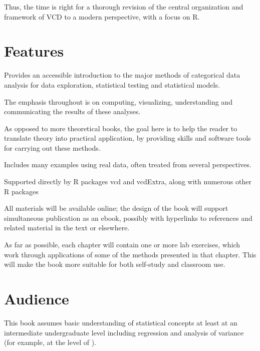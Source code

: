 \documentclass{article}
\newcommand{\VCD}{\textsf{VCD}\xspace}
\newcommand{\R}{\textsf{R}\xspace}
\newcommand{\pkg}[1]{{\normalfont\fontseries{b}\selectfont #1}}
\begin{document}
Thus, the time is right for a thorough revision of the central organization
and framework of \VCD to a modern perspective, with a focus on \R.
%

\section*{Features}

\begin{itemize*}
	\item Provides an accessible introduction to the major methods of categorical data analysis
    for data exploration, statistical testing and statistical models.
	\item The emphasis throughout is on computing, visualizing, understanding and communicating
	the results of these analyses.
    \item As opposed to more theoretical books, the goal here is to
    help the reader to translate theory into practical application, by providing skills and
    software tools for carrying out these methods.
	\item Includes many examples using real data, often treated from several perspectives.
	\item Supported directly by \R packages \pkg{vcd} and \pkg{vcdExtra}, along with numerous other \R packages
	\item All materials will be available online;  the design of the book will support simultaneous publication
    as an ebook, possibly with hyperlinks to references and related material in the text or elsewhere.
    \item As far as possible, each chapter will contain one or more lab exercises, which work through
    applications of some of the methods presented in that chapter.  This will make the book more suitable
    for both self-study and classroom use.
\end{itemize*}
	
\section*{Audience}
This book assumes basic understanding of statistical concepts at least at an
intermediate undergraduate level including regression and analysis of variance
(for example, at the level of \citet{Neter-etal:90,MendenhallSincich:2003}).
\end{document}
